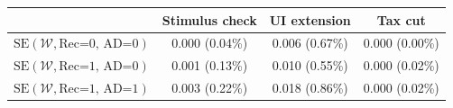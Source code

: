 \begin{tabular}{@{}lccc@{}}
\toprule
                          & Stimulus check      & UI extension    & Tax cut    \\  \midrule
$\mathrm{SE}(\mathcal{W}, \text{Rec=0, AD=0})$ & 0.000 (0.04\%)  & 0.006 (0.67\%)  & 0.000 (0.00\%)     \\
$\mathrm{SE}(\mathcal{W}, \text{Rec=1, AD=0})$ & 0.001 (0.13\%)  & 0.010 (0.55\%)  & 0.000 (0.02\%)     \\
$\mathrm{SE}(\mathcal{W}, \text{Rec=1, AD=1})$ & 0.003 (0.22\%)  & 0.018 (0.86\%)  & 0.000 (0.02\%)     \\ \bottomrule
\end{tabular}
